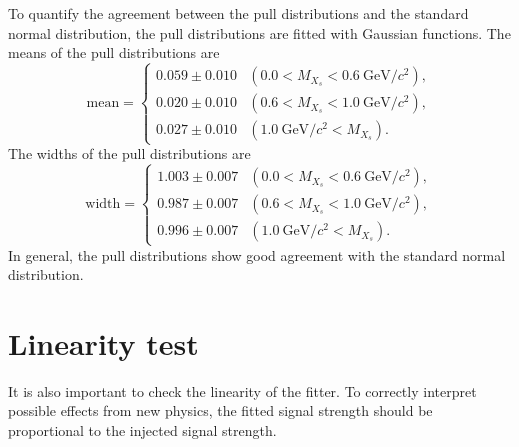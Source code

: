 To quantify the agreement between the pull distributions and the standard normal distribution, the pull distributions are fitted with Gaussian functions.
The means of the pull distributions are
\begin{equation}
    \textrm{mean} = 
  \begin{cases}
  0.059 \pm 0.010 &(0.0 < M_{X_{s}} < 0.6~\textrm{GeV}/c^{2}), \\[10pt]
  0.020 \pm 0.010 &(0.6 < M_{X_{s}} < 1.0~\textrm{GeV}/c^{2}), \\[10pt]
  0.027 \pm 0.010 &(1.0~\textrm{GeV}/c^{2} < M_{X_{s}}).
  \end{cases}
\end{equation}
The widths of the pull distributions are
\begin{equation}
    \textrm{width} = 
  \begin{cases}
  1.003 \pm 0.007 &(0.0 < M_{X_{s}} < 0.6~\textrm{GeV}/c^{2}), \\[10pt]
  0.987 \pm 0.007 &(0.6 < M_{X_{s}} < 1.0~\textrm{GeV}/c^{2}), \\[10pt]
  0.996 \pm 0.007 &(1.0~\textrm{GeV}/c^{2} < M_{X_{s}}).
  \end{cases}
\end{equation}
In general, the pull distributions show good agreement with the standard normal distribution.

\section{Linearity test}
It is also important to check the linearity of the fitter.
To correctly interpret possible effects from new physics, the fitted signal strength should be proportional to the injected signal strength.

